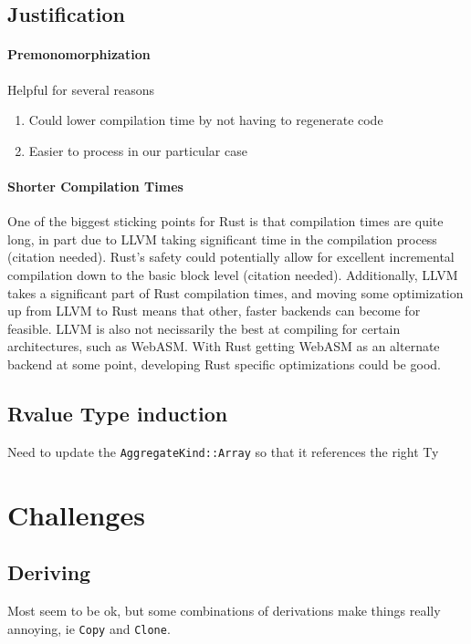 \documentclass[12pt,final]{article}
\begin{document}
\subsection{Justification}
\label{sec:just}

\paragraph{Premonomorphization} Helpful for several reasons
\begin{enumerate}
\item Could lower compilation time by not having to regenerate code
\item  Easier to process in our particular case
\end{enumerate}

\paragraph{Shorter Compilation Times} One of the biggest sticking points for
Rust is that compilation times are quite long, in part due to LLVM taking
significant time in the compilation process (citation needed). Rust's safety
could potentially allow for excellent incremental compilation down to the basic
block level (citation needed). Additionally, LLVM takes a significant part of
Rust compilation times, and moving some optimization up from LLVM to Rust means
that other, faster backends can become for feasible. LLVM is also not
necissarily the best at compiling for certain architectures, such as WebASM.
With Rust getting WebASM as an alternate backend at some point, developing Rust
specific optimizations could be good.


\subsection{Rvalue Type induction}
Need to update the \texttt{AggregateKind::Array} so that it references the right Ty

\section{Challenges}
\label{sec:annoying}

\subsection{Deriving}
Most seem to be ok, but some combinations of derivations make things really
annoying, ie \texttt{Copy} and \texttt{Clone}.
\end{document}
